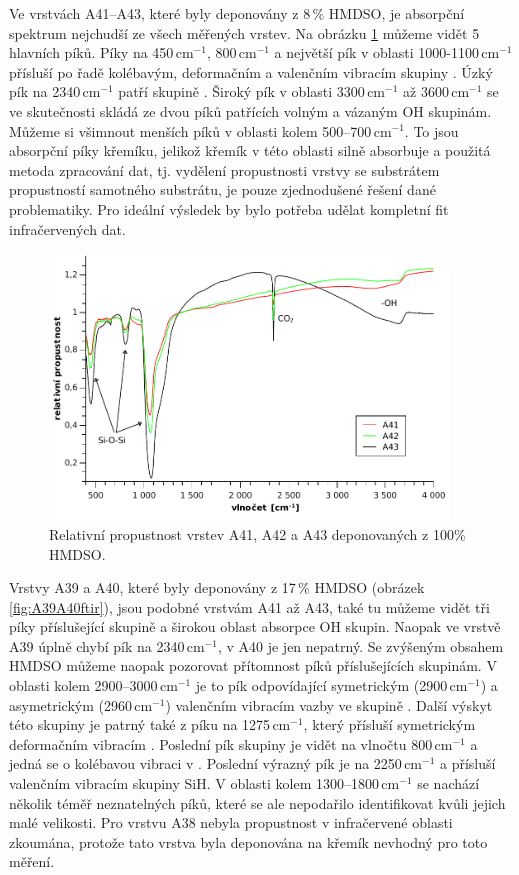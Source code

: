 \documentclass[12pt,oneside,final]{fithesis2}
\begin{document}
Ve vrstvách A41--A43, které byly deponovány z 8\,\% HMDSO, je absorpční spektrum nejchudší ze všech měřených vrstev. Na obrázku \ref{fig:A41A43ftir} můžeme vidět 5 hlavních píků. Píky na 450\,cm$^{-1}$, 800\,cm$^{-1}$ a největší pík v oblasti 1000-1100\,cm$^{-1}$ přísluší po řadě kolébavým, deformačním a valenčním vibracím skupiny . Úzký pík na 2340\,cm$^{-1}$ patří skupině . Široký pík v oblasti 3300\,cm$^{-1}$ až 3600\,cm$^{-1}$ se ve skutečnosti skládá ze dvou píků patřících volným a vázaným OH skupinám. Můžeme si všimnout menších píků v oblasti kolem 500--700\,cm$^{-1}$. To jsou absorpční píky křemíku, jelikož křemík v této oblasti silně absorbuje a použitá metoda zpracování dat, tj. vydělení propustnosti vrstvy se substrátem propustností samotného substrátu, je pouze zjednodušené řešení dané problematiky. Pro ideální výsledek by bylo potřeba udělat kompletní fit infračervených dat.

\begin{figure}
  \centering
  \includegraphics[width=400px]{img/A41A43ftir.pdf}
  \caption{Relativní propustnost vrstev A41, A42 a A43 deponovaných z 100\% HMDSO.}
  \label{fig:A41A43ftir} 
\end{figure}

Vrstvy A39 a A40, které byly deponovány z 17\,\% HMDSO (obrázek \ref{fig:A39A40ftir}), jsou podobné vrstvám A41 až A43, také tu můžeme vidět tři píky příslušející  skupině a širokou oblast absorpce OH skupin. Naopak ve vrstvě A39 úplně chybí pík na 2340\,cm$^{-1}$, v A40 je jen nepatrný. Se zvýšeným obsahem HMDSO můžeme naopak pozorovat přítomnost píků příslušejících  skupinám. V oblasti kolem 2900--3000\,cm$^{-1}$ je to pík odpovídající symetrickým (2900\,cm$^{-1}$) a asymetrickým (2960\,cm$^{-1}$) valenčním vibracím vazby  ve skupině . Další výskyt této skupiny je patrný také z píku na 1275\,cm$^{-1}$, který přísluší symetrickým deformačním vibracím . Poslední pík skupiny  je vidět na vlnočtu 800\,cm$^{-1}$ a jedná se o kolébavou vibraci  v . Poslední výrazný pík je na 2250\,cm$^{-1}$ a přísluší valenčním vibracím skupiny SiH. V oblasti kolem 1300--1800\,cm$^{-1}$ se nachází několik téměř neznatelných píků, které se ale nepodařilo identifikovat kvůli jejich malé velikosti. Pro vrstvu A38 nebyla propustnost v infračervené oblasti zkoumána, protože tato vrstva byla deponována na křemík nevhodný pro toto měření.
\end{document}
